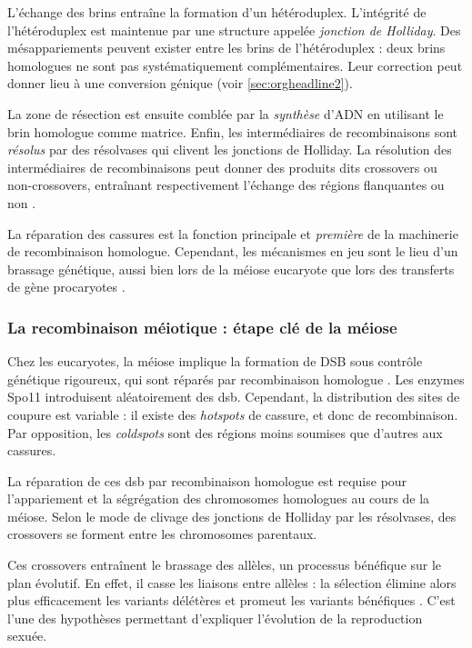 \documentclass[11pt, oneside]{scrartcl}
\begin{document}
L'échange des brins entraîne la formation d'un hétéroduplex. L'intégrité de
l'hétéroduplex est maintenue par une structure appelée \emph{jonction de Holliday}.
Des mésappariements peuvent exister entre les brins de l'hétéroduplex : deux
brins homologues ne sont pas systématiquement complémentaires. Leur correction
peut donner lieu à une conversion génique (voir \ref{sec:orgheadline2}).

La zone de résection est ensuite comblée par la \emph{synthèse} d'ADN en utilisant le
brin homologue comme matrice. Enfin, les intermédiaires de recombinaisons sont
\emph{résolus} par des résolvases qui clivent les jonctions de Holliday. La résolution
des intermédiaires de recombinaisons peut donner des produits dits crossovers ou
non-crossovers, entraînant respectivement l'échange des régions flanquantes ou
non \cite{mancera_high-resolution_2008}.

\begin{transition}
La réparation des cassures est la fonction principale et \emph{première} de la
machinerie de recombinaison homologue. Cependant, les mécanismes en jeu sont le
lieu d'un brassage génétique, aussi bien lors de la méiose eucaryote que lors
des transferts de gène procaryotes \cite{redfield_bacteria_2001}.
\end{transition}

\subsubsection{La recombinaison méiotique : étape clé de la méiose}
\label{sec:orgheadline4}

Chez les eucaryotes, la méiose implique la formation de DSB sous contrôle
génétique rigoureux, qui sont réparés par recombinaison homologue
\cite{chapman_playing_2012}. Les enzymes Spo11 introduisent aléatoirement des
\ac{dsb}. Cependant, la distribution des sites de coupure est variable : il
existe des \emph{hotspots} de cassure, et donc de recombinaison. Par opposition, les
\emph{coldspots} sont des régions moins soumises que d'autres aux cassures.

La réparation de ces \ac{dsb} par recombinaison homologue est requise pour
l'appariement et la ségrégation des chromosomes homologues au cours de la
méiose. Selon le mode de clivage des jonctions de Holliday par les résolvases,
des crossovers se forment entre les chromosomes parentaux. 

Ces crossovers entraînent le brassage des allèles, un processus bénéfique sur le
plan évolutif\cite{webster_direct_2012}. En effet, il casse les liaisons entre
allèles : la sélection élimine alors plus efficacement les variants délétères et
promeut les variants bénéfiques \cite{otto_resolving_2002}. C'est l'une des
hypothèses permettant d'expliquer l'évolution de la reproduction
sexuée\cite{otto_why_2006}.
\end{document}
